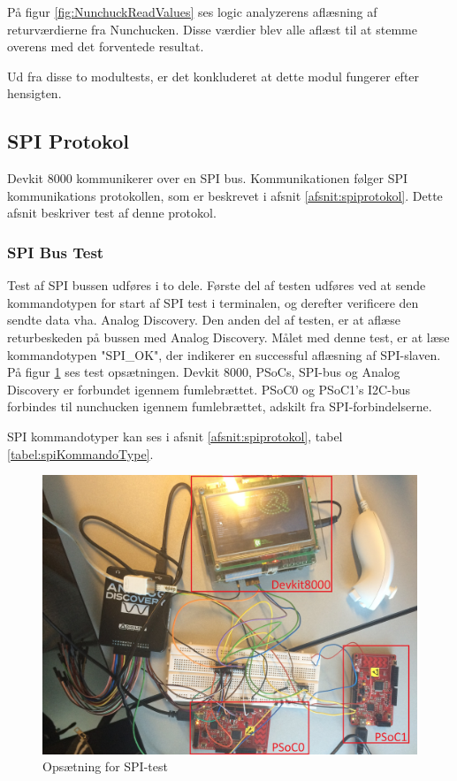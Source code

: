 \noindent På figur \ref{fig:NunchuckReadValues} ses logic analyzerens aflæsning af returværdierne fra Nunchucken. Disse værdier blev alle aflæst til at stemme overens med det forventede resultat.\newline

\noindent Ud fra disse to modultests, er det konkluderet at dette modul fungerer efter hensigten. \newline 

\subsection{SPI Protokol}
Devkit 8000 kommunikerer over en SPI bus. Kommunikationen følger SPI kommunikations protokollen, som er beskrevet i afsnit \ref{afsnit:spiprotokol}. Dette afsnit beskriver test af denne protokol.

\subsubsection{SPI Bus Test}
Test af SPI bussen udføres i to dele. Første del af testen udføres ved at sende kommandotypen for start af SPI test i terminalen, og derefter verificere den sendte data vha. Analog Discovery. Den anden del af testen, er at aflæse returbeskeden på bussen med Analog Discovery. Målet med denne test, er at læse kommandotypen "SPI\_OK", der indikerer en successful aflæsning af SPI-slaven.  På figur \ref{figure:SpiTestSetup} ses test opsætningen. Devkit 8000, PSoCs, SPI-bus og Analog Discovery  er forbundet igennem fumlebrættet. PSoC0 og PSoC1's I2C-bus forbindes til nunchucken igennem fumlebrættet, adskilt fra SPI-forbindelserne. \newline

\noindent SPI kommandotyper kan ses i afsnit \ref{afsnit:spiprotokol}, tabel \ref{tabel:spiKommandoType}.

\begin{figure}[H]
	\centering
	\includegraphics[width=\textwidth]{Test/images/SPItest/SpiTestSetup}
	\caption{Opsætning for SPI-test}
	\label{figure:SpiTestSetup}
\end{figure}

